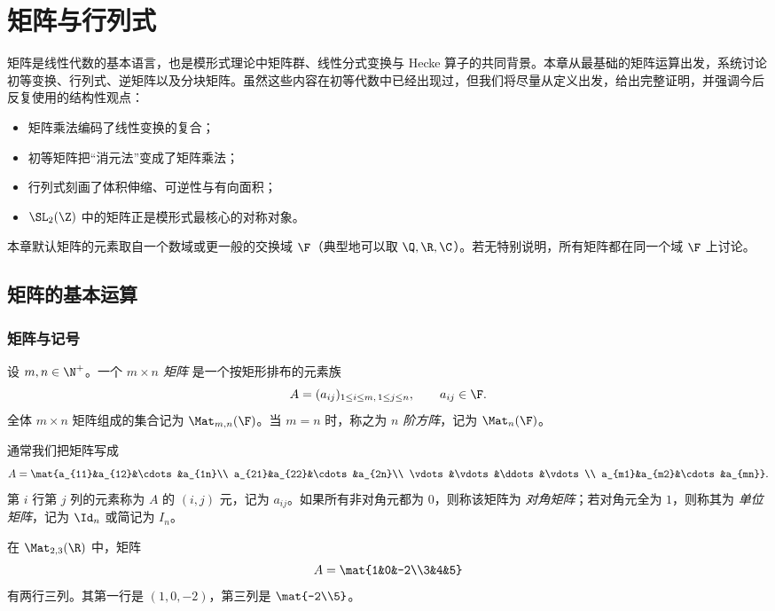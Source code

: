 \chapter{矩阵与行列式}

矩阵是线性代数的基本语言，也是模形式理论中矩阵群、线性分式变换与 Hecke 算子的共同背景。本章从最基础的矩阵运算出发，系统讨论初等变换、行列式、逆矩阵以及分块矩阵。虽然这些内容在初等代数中已经出现过，但我们将尽量从定义出发，给出完整证明，并强调今后反复使用的结构性观点：
\begin{itemize}
  \item 矩阵乘法编码了线性变换的复合；
  \item 初等矩阵把“消元法”变成了矩阵乘法；
  \item 行列式刻画了体积伸缩、可逆性与有向面积；
  \item $\SL_2(\Z)$ 中的矩阵正是模形式最核心的对称对象。
\end{itemize}

本章默认矩阵的元素取自一个数域或更一般的交换域 $\F$（典型地可以取 $\Q,\R,\C$）。若无特别说明，所有矩阵都在同一个域 $\F$ 上讨论。

\section{矩阵的基本运算}

\subsection{矩阵与记号}

\begin{definition}
设 $m,n\in\N^+$。一个 \emph{$m\times n$ 矩阵} 是一个按矩形排布的元素族
\[
A=(a_{ij})_{1\le i\le m,\,1\le j\le n},\qquad a_{ij}\in \F.
\]
全体 $m\times n$ 矩阵组成的集合记为 $\Mat_{m,n}(\F)$。当 $m=n$ 时，称之为 \emph{$n$ 阶方阵}，记为 $\Mat_n(\F)$。
\end{definition}

通常我们把矩阵写成
\[
A=\mat{a_{11}&a_{12}&\cdots&a_{1n}\\
         a_{21}&a_{22}&\cdots&a_{2n}\\
         \vdots&\vdots&\ddots&\vdots\\
         a_{m1}&a_{m2}&\cdots&a_{mn}}.
\]
第 $i$ 行第 $j$ 列的元素称为 $A$ 的 $(i,j)$ 元，记为 $a_{ij}$。如果所有非对角元都为 $0$，则称该矩阵为 \emph{对角矩阵}；若对角元全为 $1$，则称其为 \emph{单位矩阵}，记为 $\Id_n$ 或简记为 $I_n$。

\begin{example}
在 $\Mat_{2,3}(\R)$ 中，矩阵
\[
A=\mat{1&0&-2\\3&4&5}
\]
有两行三列。其第一行是 $(1,0,-2)$，第三列是 $\mat{-2\\5}$。
\end{example}

